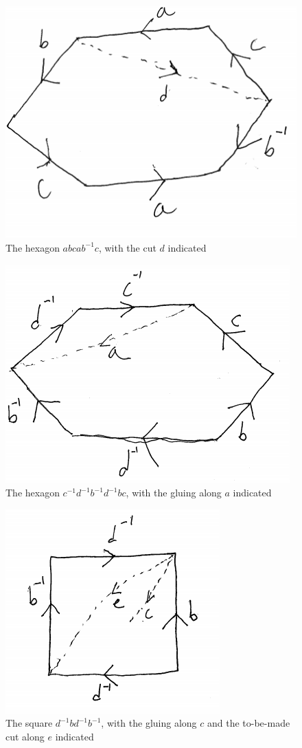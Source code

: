 \documentclass[english]{article}
\theoremstyle{remark}
\theoremstyle{definition}
\begin{document}
\appendix
\begin{figure}[h]\centering
	\includegraphics[scale=.6]{3-3fig1}\caption{The hexagon $abcab^{-1}c$, with the cut $d$ indicated \label{fig1}}
\end{figure}
\begin{figure}[h]\centering
	\includegraphics[scale=.6]{3-3fig2}\caption{The hexagon $c^{-1}d^{-1}b^{-1}d^{-1}bc$, with the gluing along $a$ indicated \label{fig2}}
\end{figure}
\begin{figure}[h]\centering
	\includegraphics[scale=.6]{3-3fig3}\caption{The square $d^{-1}bd^{-1}b^{-1}$, with the gluing along $c$ and the to-be-made cut along $e$ indicated \label{fig3}}
\end{figure}
\end{document}
